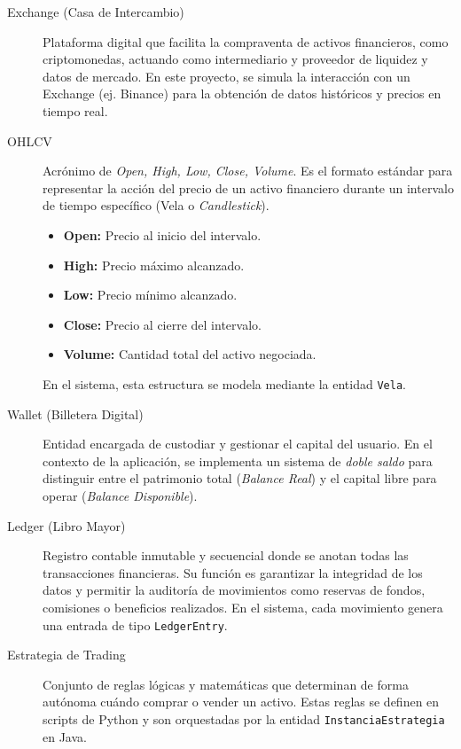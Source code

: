 \documentclass[12pt, letterpaper]{article}
\begin{document}
\begin{description}
    \item[Exchange (Casa de Intercambio)] Plataforma digital que facilita la compraventa de activos financieros, como criptomonedas, actuando como intermediario y proveedor de liquidez y datos de mercado. En este proyecto, se simula la interacción con un Exchange (ej. Binance) para la obtención de datos históricos y precios en tiempo real.

    \item[OHLCV] Acrónimo de \textit{Open, High, Low, Close, Volume}. Es el formato estándar para representar la acción del precio de un activo financiero durante un intervalo de tiempo específico (Vela o \textit{Candlestick}). 
    \begin{itemize}
        \item \textbf{Open:} Precio al inicio del intervalo.
        \item \textbf{High:} Precio máximo alcanzado.
        \item \textbf{Low:} Precio mínimo alcanzado.
        \item \textbf{Close:} Precio al cierre del intervalo.
        \item \textbf{Volume:} Cantidad total del activo negociada.
    \end{itemize}
    En el sistema, esta estructura se modela mediante la entidad \texttt{Vela}.

    \item[Wallet (Billetera Digital)] Entidad encargada de custodiar y gestionar el capital del usuario. En el contexto de la aplicación, se implementa un sistema de \textit{doble saldo} para distinguir entre el patrimonio total (\textit{Balance Real}) y el capital libre para operar (\textit{Balance Disponible}).

    \item[Ledger (Libro Mayor)] Registro contable inmutable y secuencial donde se anotan todas las transacciones financieras. Su función es garantizar la integridad de los datos y permitir la auditoría de movimientos como reservas de fondos, comisiones o beneficios realizados. En el sistema, cada movimiento genera una entrada de tipo \texttt{LedgerEntry}.

    \item[Estrategia de Trading] Conjunto de reglas lógicas y matemáticas que determinan de forma autónoma cuándo comprar o vender un activo. Estas reglas se definen en scripts de Python y son orquestadas por la entidad \texttt{InstanciaEstrategia} en Java.


\end{description}
\end{document}
